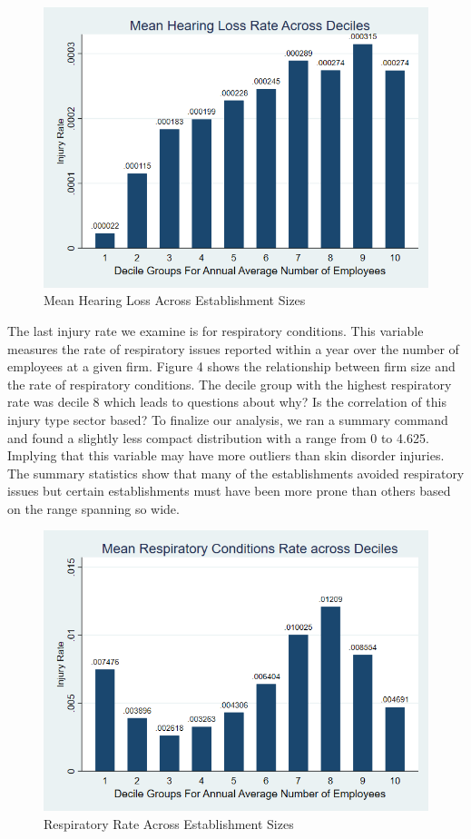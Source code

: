 \documentclass[12pt]{article}
\begin{document}
\begin{figure}
    \centering
    \includegraphics[width=0.7\linewidth]{HearingDecileBar.png}
    \caption{Mean Hearing Loss Across Establishment Sizes}
    \label{fig:enter-label}
\end{figure}




The last injury rate we examine is for respiratory conditions. This variable measures the rate of respiratory issues reported within a year over the number of employees at a given firm. Figure 4 shows the relationship between firm size and the rate of respiratory conditions. The decile group with the highest respiratory rate was decile 8 which leads to questions about why? Is the correlation of this injury type sector based? To finalize our analysis, we ran a summary command and found a slightly less compact  distribution with a range from 0 to 4.625. Implying that this variable may have more outliers than skin disorder injuries. The summary statistics show that many of the establishments avoided respiratory issues but certain establishments must have been more prone than others based on the range spanning so wide. 


\begin{figure}
    \centering
    \includegraphics[width=0.7\linewidth]{RespiratoryDecileBar (2).png}
    \caption{Respiratory Rate Across Establishment Sizes }
    \label{fig:enter-label}
\end{figure}
\end{document}

